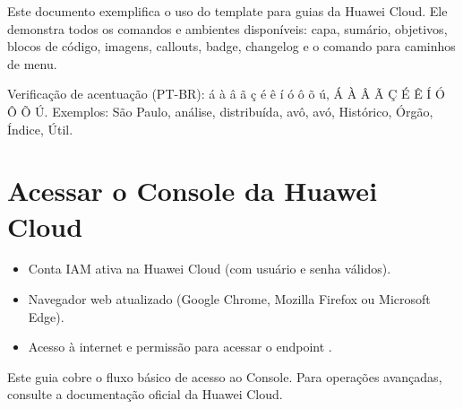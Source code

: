 \documentclass[portuguese]{guide}
\begin{document}
\makecover

\maketoc

\startbody

\begin{infobox}
Este documento exemplifica o uso do template  para guias
da Huawei Cloud. Ele demonstra todos os comandos e ambientes disponíveis:
capa, sumário, objetivos, blocos de código, imagens, callouts, badge,
changelog e o comando  para caminhos de menu.

Verificação de acentuação (PT-BR): á à â ã ç é ê í ó ô õ ú,
Á À Â Ã Ç É Ê Í Ó Ô Õ Ú. Exemplos: São Paulo, análise, distribuída,
avô, avó, Histórico, Órgão, Índice, Útil.
\end{infobox}

\section{Acessar o Console da Huawei Cloud}

\begin{objectives}

  \prerequisites
  \begin{itemize}
    \item Conta IAM ativa na Huawei Cloud (com usuário e senha válidos).
    \item Navegador web atualizado (Google Chrome, Mozilla Firefox ou
          Microsoft Edge).
    \item Acesso à internet e permissão para acessar o endpoint
          .
  \end{itemize}
\end{objectives}

\begin{infobox}
Este guia cobre o fluxo básico de acesso ao Console. Para operações
avançadas, consulte a documentação oficial da Huawei Cloud.
\end{infobox}
\end{document}
